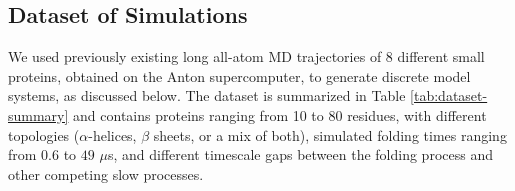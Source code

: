 \subsection{\label{sec:methods-dataset}Dataset of Simulations}

We used previously existing long all-atom MD trajectories
of 8 different small proteins\cite{lindorff2011}, obtained on the Anton supercomputer, to generate
discrete model systems, as discussed below. The dataset is summarized in Table
\ref{tab:dataset-summary} and contains proteins ranging from 10 to 80 residues,
with different topologies ($\alpha$-helices, $\beta$ sheets, or a mix of both),
simulated folding times ranging from $0.6$ to $49$ $\mu$s, and different timescale gaps between
the folding process and other competing slow processes.

\begin{table}[!ht]
\centering
\caption{Previously simulated proteins used to generate discrete models in this study}
\label{tab:dataset-summary}
\end{table}

